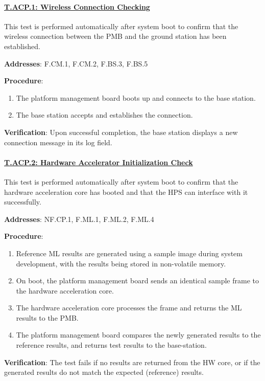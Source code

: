 \paragraph{\underline{T.ACP.1: Wireless Connection Checking}}

This test is performed automatically after system boot to confirm that the wireless connection between the PMB and the ground station has been established.

\textbf{Addresses}: F.CM.1, F.CM.2, F.BS.3, F.BS.5

\textbf{Procedure}:
\begin{enumerate}[noitemsep]
    \item The platform management board boots up and connects to the base station.
    \item The base station accepts and establishes the connection.
\end{enumerate}

\textbf{Verification}: 
Upon successful completion, the base station displays a new connection message in its log field.

\paragraph{\underline{T.ACP.2: Hardware Accelerator Initialization Check}}

This test is performed automatically after system boot to confirm that the hardware acceleration core has booted and that the HPS can interface with it successfully.

\textbf{Addresses}: NF.CP.1, F.ML.1, F.ML.2, F.ML.4

\textbf{Procedure}:
\begin{enumerate}[noitemsep]
	\item Reference ML results are generated using a sample image during system development, with the results being stored in non-volatile memory.
    \item On boot, the platform management board sends an identical sample frame to the hardware acceleration core.
    \item The hardware acceleration core processes the frame and returns the ML results to the PMB.
    \item The platform management board compares the newly generated results to the reference results, and returns test results to the base-station.
\end{enumerate}

\textbf{Verification}: 
The test fails if no results are returned from the HW core, or if the generated results do not match the expected (reference) results.